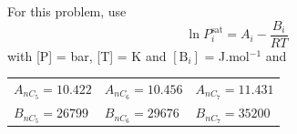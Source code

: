 \documentclass[calculator,steamtables,allquestions,datasheet]{exam_newMarcus2}
\newcommand{\frc}{\displaystyle\frac}
\begin{document}
\begin{question}
{}

For this problem, use 
\begin{displaymath}
   \ln P_{i}^{\text{sat}} = A_{i} - \frc{B_{i}}{RT}
\end{displaymath} 
with [P] = bar, [T] = K and $\left[\text{B}_{i}\right]$ = J.mol$^{-1}$ and
    \begin{center}
       \begin{tabular}{l l l} 
          $A_{nC_{5}}=10.422$ & $A_{nC_{6}}=10.456$ & $A_{nC_{7}}=11.431$ \\
          $B_{nC_{5}}=26799$  & $B_{nC_{6}}=29676$  & $B_{nC_{7}}=35200$  
       \end{tabular}
    \end{center}
%
\end{question}

\clearpage
\end{document}
